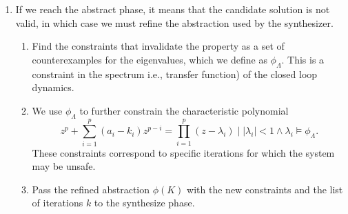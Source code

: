 \documentclass[sigconf]{llncs}
\begin{document}
\begin{enumerate}
\item If we reach the {\sc abstract} phase, it means that the candidate
  solution is not valid, in which case we must refine the abstraction used
  by the synthesizer.
%
\begin{enumerate}
%
\item Find the constraints that invalidate the property
 as a set of counterexamples for the eigenvalues, which we define as
$\phi_\Lambda$.  This is a constraint in the spectrum i.e., transfer
function) of the closed loop dynamics.
%
\item We use $\phi_\Lambda$ to further constrain the characteristic polynomial 
\begin{equation*}
z^p+\sum_{i=1}^p(a_i-k_i)z^{p-i}=\prod_{i=1}^p (z-\lambda_i) \mid |\lambda_i|<1 \wedge \lambda_i \models \phi_{\Lambda}.
\end{equation*} 
These constraints correspond to specific iterations for which the system may be unsafe.

\item Pass the refined abstraction $\phi(K)$ with the new constraints and the list of iterations $k$ to the {\sc synthesize} phase.
\end{enumerate} 
\end{enumerate}
\end{document}
